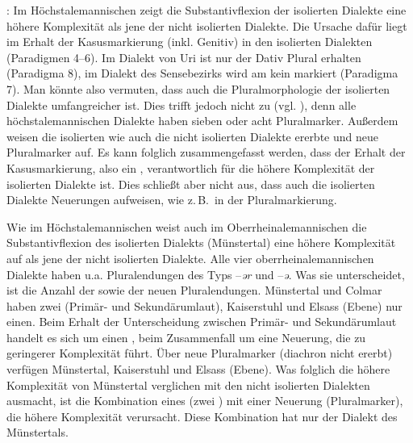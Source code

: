 {:} Im Höchstalemannischen zeigt die Substantivflexion der isolierten Dialekte eine höhere Komplexität als jene der nicht isolierten Dialekte. Die Ursache dafür liegt im Erhalt der Kasusmarkierung (inkl. Genitiv) in den isolierten Dialekten (Paradigmen 4–6). Im Dialekt von Uri ist nur der Dativ Plural erhalten (Paradigma 8), im Dialekt des Sensebezirks wird am  kein  markiert (Paradigma 7). Man könnte also vermuten, dass auch die Pluralmorphologie der isolierten Dialekte umfangreicher ist. Dies trifft jedoch nicht zu (vgl. ), denn alle höchstalemannischen Dialekte haben sieben oder acht Pluralmarker. Außerdem weisen die isolierten wie auch die nicht isolierten Dialekte ererbte und neue Pluralmarker auf. Es kann folglich zusammengefasst werden, dass der Erhalt der Kasusmarkierung, also ein , verantwortlich für die höhere Komplexität der isolierten Dialekte ist. Dies schließt aber nicht aus, dass auch die isolierten Dialekte Neuerungen aufweisen, wie z.\,B.\ in der Pluralmarkierung.

Wie im Höchstalemannischen weist auch im Oberrheinalemannischen die Substantivflexion des isolierten Dialekts (Münstertal) eine höhere Komplexität auf als jene der nicht isolierten Dialekte. Alle vier oberrheinalemannischen Dialekte haben u.a. Pluralendungen des Typs –\textit{ər} und –\textit{ə}. Was sie unterscheidet, ist die Anzahl der  sowie der neuen Pluralendungen. Münstertal und Colmar haben zwei  (Primär- und Sekundärumlaut), Kaiserstuhl und Elsass (Ebene) nur einen. Beim Erhalt der Unterscheidung zwischen Primär- und Sekundärumlaut handelt es sich um einen , beim Zusammenfall um eine Neuerung, die zu geringerer Komplexität führt. Über neue Pluralmarker (diachron nicht ererbt) verfügen Münstertal, Kaiserstuhl und Elsass (Ebene). Was folglich die höhere Komplexität von Münstertal verglichen mit den nicht isolierten Dialekten ausmacht, ist die Kombination eines  (zwei ) mit einer Neuerung (Pluralmarker), die höhere Komplexität verursacht. Diese Kombination hat nur der Dialekt des Münstertals.

